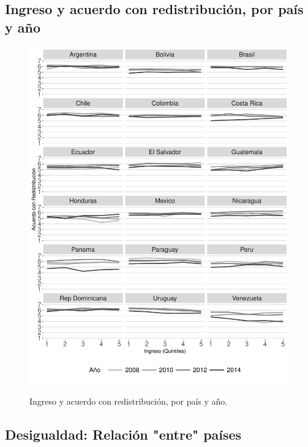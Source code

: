 \documentclass[12pt,letterpaper]{article}
\begin{document}
\newpage

\subsection{Ingreso y acuerdo con redistribución, por país y año \label{sec:sec66}}

\begin{center}
	\begin{figure}[H]
		\caption[Ingreso y acuerdo con redistribución, por país y año.]{Ingreso y acuerdo con redistribución, por país y año.}
		\includegraphics[width=1\textwidth]{G9.pdf}
		\label{fig:g4}
	\end{figure}
\end{center}

\newpage

\subsection{Desigualdad: Relación "entre" países \label{sec:sec62}}
\end{document}

